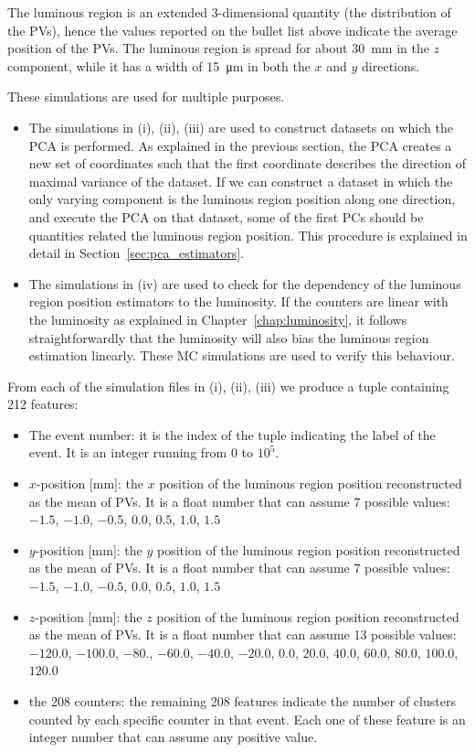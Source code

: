 The luminous region is an extended 3-dimensional quantity (the distribution of the PVs), hence the values reported on the bullet list above indicate the average position of the PVs. The luminous region is spread for about \SI{30}{\milli\meter} in the $z$ component, while it has a width of \SI{15}{\micro\meter} in both the $x$ and $y$ directions.  

These simulations are used for multiple purposes. 
\begin{itemize}
\item The simulations in (i), (ii), (iii) are used to construct datasets on which the PCA is performed. As explained in the previous section, the PCA creates a new set of coordinates such that the first coordinate describes the direction of maximal variance of the dataset. If we can construct a dataset in which the only varying component is the luminous region position along one direction, and execute the PCA on that dataset, some of the first PCs should be quantities related the luminous region position. This procedure is explained in detail in Section~\ref{sec:pca_estimators}.
\item The simulations in (iv) are used to check for the dependency of the luminous region position estimators to the luminosity. If the counters are linear with the luminosity as explained in Chapter~\ref{chap:luminosity}, it follows straightforwardly that the luminosity will also bias the luminous region estimation linearly. These MC simulations are used to verify this behaviour.
\end{itemize}

From each of the simulation files in (i), (ii), (iii) we produce a tuple containing 212 features:
\begin{itemize}
    \item The event number: it is the index of the tuple indicating the label of the event. It is an integer running from $0$ to $10^5$.
    \item $x$-position [mm]: the $x$ position of the luminous region position reconstructed as the mean of PVs. It is a float number that can assume 7 possible values: $-1.5$, $-1.0$, $-0.5$, $0.0$, $0.5$, $1.0$, $1.5$
    \item $y$-position [mm]: the $y$ position of the luminous region position reconstructed as the mean of PVs. It is a float number that can assume 7 possible values: $-1.5$, $-1.0$, $-0.5$, $0.0$, $0.5$, $1.0$, $1.5$
    \item $z$-position [mm]: the $z$ position of the luminous region position reconstructed as the mean of PVs. It is a float number that can assume 13 possible values: \\
    $-120.0$, $-100.0$, $-80.$, $-60.0$, $-40.0$, $-20.0$, $0.0$, $20.0$, $40.0$, $60.0$, $80.0$, $100.0$, $120.0$
    \item the 208 counters: the remaining 208 features indicate the number of clusters counted by each specific counter in that event. Each one of these feature is an integer number that can assume any positive value.
\end{itemize}

